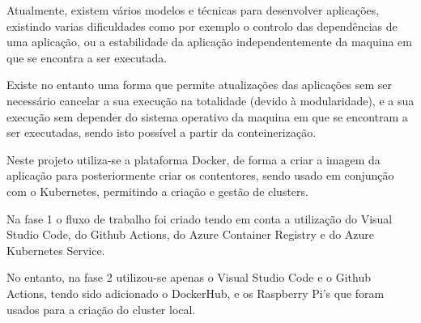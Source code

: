 \par Atualmente, existem vários modelos e técnicas para desenvolver aplicações, existindo varias dificuldades como por exemplo o controlo das dependências de uma aplicação, ou a estabilidade da aplicação independentemente da maquina em que se encontra a ser executada.

\par Existe no entanto uma forma que permite atualizações das aplicações sem ser necessário cancelar a sua execução na totalidade (devido à modularidade), e a sua execução sem depender do sistema operativo da maquina em que se encontram a ser executadas, sendo isto possível a partir da conteinerização.

\par Neste projeto utiliza-se a plataforma Docker, de forma a criar a imagem da aplicação para posteriormente criar os contentores, sendo usado em conjunção com o Kubernetes, permitindo a criação e gestão de clusters.

\par Na fase 1 o fluxo de trabalho foi criado tendo em conta a utilização do Visual Studio Code, do Github Actions, do Azure Container Registry e do Azure Kubernetes Service.

\par No entanto, na fase 2 utilizou-se apenas o Visual Studio Code e o Github Actions, tendo sido adicionado o DockerHub, e os Raspberry Pi's que foram usados para a criação do cluster local.
